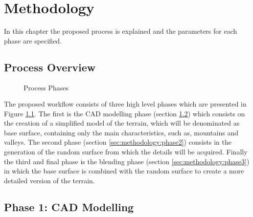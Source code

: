 \chapter{Methodology} \label{chap:methodology}

In this chapter the proposed process is explained and the parameters for each phase are specified.

\section{Process Overview}

\begin{figure}[h!]
	\begin{center}
	\end{center}
	
	\caption{Process Phases}
	\label{fig:process_phases}
\end{figure}

The proposed workflow consists of three high level phases which are presented in Figure \ref{fig:process_phases}. The first is the CAD modelling phase (section \ref{sec:methodology:phase1}) which consists on the creation of a simplified model of the terrain, which will be denominated as base surface, containing only the main characteristics, such as, mountains and valleys. The second phase (section \ref{sec:methodology:phase2}) consists in the generation of the random surface from which the details will be acquired. Finally the third and final phase is the blending phase (section \ref{sec:methodology:phase3}) in which the base surface is combined with the random surface to create a more detailed version of the terrain.

\section {Phase 1: CAD Modelling} \label{sec:methodology:phase1}

